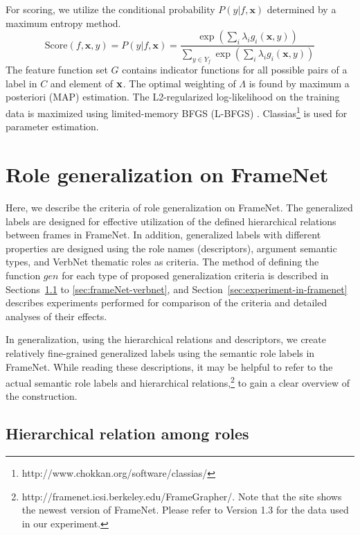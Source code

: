 \documentclass[english]{jnlp_1.4_rep}
\begin{document}
For scoring, we utilize the conditional probability $P(y|f,\mathbf{x})$ determined by a maximum entropy method.
\begin{equation}
\mathrm{Score}(f,\mathbf{x},y) = P(y|f,\mathbf{x}) =
  \frac{\exp(\sum_{i}\lambda_{i}g_i(\mathbf{x},y))}{\sum_{y\in Y_f}\exp(\sum_{i}\lambda_{i}g_i(\mathbf{x},y))}
\label{eqn:probability}
\end{equation}
The feature function set $G$ contains indicator functions for all possible pairs of a label in $C$ and element of ${\bf x}$.
The optimal weighting of $\Lambda$ is found by maximum a posteriori (MAP) estimation. The L2-regularized log-likelihood on the training data is maximized using limited-memory BFGS (L-BFGS) \cite{nocedal1980}. Classias\footnote{http://www.chokkan.org/software/classias/} is used for parameter estimation.


\section{Role generalization on FrameNet}
\label{sec:generalization-criteria-framenet}

Here, we describe the criteria of role generalization on FrameNet. The generalized labels are designed for effective utilization of the defined hierarchical relations between frames in FrameNet. In addition, generalized labels with different properties are designed using the role names (descriptors), argument semantic types, and VerbNet thematic roles as criteria. The method of defining the function $gen$ for each type of proposed generalization criteria is described in Sections~\ref{sec:hierarchical-relations} to \ref{sec:frameNet-verbnet}, and Section~\ref{sec:experiment-in-framenet} describes experiments performed for comparison of the criteria and detailed analyses of their effects.

In generalization, using the hierarchical relations and descriptors, we create relatively fine-grained generalized labels using the semantic role labels in FrameNet. While reading these descriptions, it may be helpful to refer to the actual semantic role labels and hierarchical relations,\footnote{http://framenet.icsi.berkeley.edu/FrameGrapher/. Note that the site shows the newest version of FrameNet. Please refer to Version 1.3 for the data used in our experiment.} to gain a clear overview of the construction.


\subsection{Hierarchical relation among roles}
\label{sec:hierarchical-relations}
\end{document}
